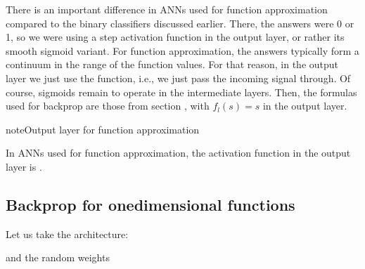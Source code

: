 \documentclass[a4paper,12pt,polish]{jupyterBook}
\begin{document}
\sphinxAtStartPar
There is an important difference in ANNs used for function approximation compared to the binary classifiers discussed earlier. There, the answers were 0 or 1, so we were using a step activation function in the output layer, or rather its smooth sigmoid variant. For function approximation, the answers typically form a continuum in the range of the function values. For that reason, in the output layer we just use the  function, i.e., we just pass the incoming signal through. Of course, sigmoids remain to operate in the intermediate layers. Then, the formulas used for backprop are those from section {\hyperref[\detokenize{docs/backprop:bpa-lab}]{}}, with \(f_l(s)=s\) in the output layer.

\begin{sphinxadmonition}{note}{Output layer for function approximation}

\sphinxAtStartPar
In ANNs used for function approximation, the activation function in the output layer is .
\end{sphinxadmonition}


\subsection{Backprop for one\sphinxhyphen{}dimensional functions}
\label{\detokenize{docs/interpol:backprop-for-one-dimensional-functions}}
\sphinxAtStartPar
Let us take the architecture:
\begin{sphinxVerbatimInput}

\begin{sphinxVerbatim}[commandchars=\\\{\}]
\PYG{p}{[}\PYG{p}{]}
\end{sphinxVerbatim}
\end{sphinxVerbatimInput}

\sphinxAtStartPar
and the random weights
\begin{sphinxVerbatimInput}

\begin{sphinxVerbatim}[commandchars=\\\{\}]
 
\end{sphinxVerbatim}
\end{sphinxVerbatimInput}
\end{document}
